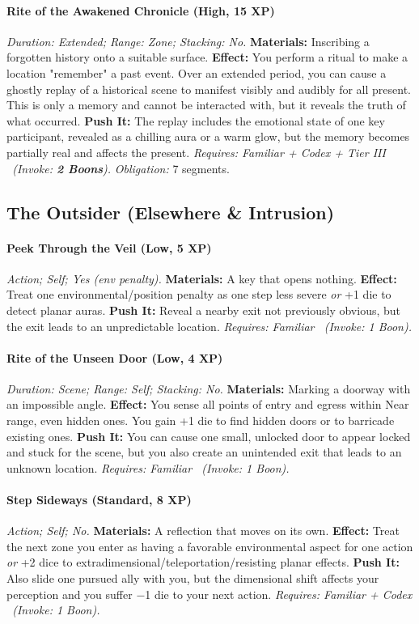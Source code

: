\documentclass[12pt,twoside]{book}
\begin{document}
\paragraph{Rite of the Awakened Chronicle (High, 15 XP)} \emph{Duration: Extended; Range: Zone; Stacking: No.}
\textbf{Materials:} Inscribing a forgotten history onto a suitable surface.
\textbf{Effect:} You perform a ritual to make a location "remember" a past event. Over an extended period, you can cause a ghostly replay of a historical scene to manifest visibly and audibly for all present. This is only a memory and cannot be interacted with, but it reveals the truth of what occurred.
\textbf{Push It:} The replay includes the emotional state of one key participant, revealed as a chilling aura or a warm glow, but the memory becomes partially real and affects the present.
\emph{Requires: Familiar + Codex + Tier III \ (\textit{Invoke:} \textbf{2 Boons}).}
\emph{Obligation:} 7 segments.

\subsection{The Outsider (Elsewhere \& Intrusion)}
\paragraph{Peek Through the Veil (Low, 5 XP)} \emph{Action; Self; Yes (env penalty).}
\textbf{Materials:} A key that opens nothing.
\textbf{Effect:} Treat one environmental/position penalty as one step less severe \emph{or} +1 die to detect planar auras.
\textbf{Push It:} Reveal a nearby exit not previously obvious, but the exit leads to an unpredictable location.
\emph{Requires: Familiar \ (\textit{Invoke:} 1 Boon).}
\paragraph{Rite of the Unseen Door (Low, 4 XP)} \emph{Duration: Scene; Range: Self; Stacking: No.}
\textbf{Materials:} Marking a doorway with an impossible angle.
\textbf{Effect:} You sense all points of entry and egress within Near range, even hidden ones. You gain +1 die to find hidden doors or to barricade existing ones.
\textbf{Push It:} You can cause one small, unlocked door to appear locked and stuck for the scene, but you also create an unintended exit that leads to an unknown location.
\emph{Requires: Familiar \ (\textit{Invoke:} 1 Boon).}
\paragraph{Step Sideways (Standard, 8 XP)} \emph{Action; Self; No.}
\textbf{Materials:} A reflection that moves on its own.
\textbf{Effect:} Treat the next zone you enter as having a favorable environmental aspect for one action \emph{or} +2 dice to extradimensional/teleportation/resisting planar effects.
\textbf{Push It:} Also slide one pursued ally with you, but the dimensional shift affects your perception and you suffer −1 die to your next action.
\emph{Requires: Familiar + Codex \ (\textit{Invoke:} 1 Boon).}
\end{document}
